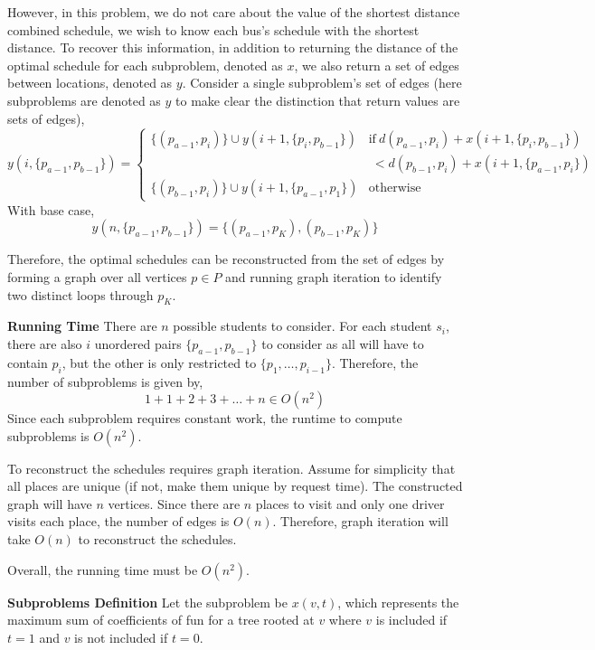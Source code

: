 \documentclass[12pt,twoside]{article}
\begin{document}
\begin{problems}
However, in this problem, we do not care about the value of the shortest
distance combined schedule, we wish to know each bus's schedule with the
shortest distance. To recover this information, in addition to returning the
distance of the optimal schedule for each subproblem, denoted as $x$, we also
return a set of edges between locations, denoted as $y$. Consider a single
subproblem's set of edges (here subproblems are denoted as $y$ to make clear
the distinction that return values are sets of edges),
$$ y(i, \{p_{a-1}, p_{b-1}\}) = \begin{cases}
  \{(p_{a-1}, p_i)\} \cup y(i + 1, \{p_i, p_{b-1}\}) & \mathrm{if}\ d(p_{a-1}, p_i)
  + x(i + 1, \{p_i, p_{b-1}\}) \\
  & \ < d(p_{b-1}, p_i) + x(i + 1, \{p_{a-1}, p_i\}) \\
  \{(p_{b-1}, p_i)\} \cup y(i + 1, \{p_{a-1}, p_1\}) & \mathrm{otherwise}
\end{cases} $$
With base case,
$$ y(n, \{p_{a-1}, p_{b-1}\}) = \{(p_{a-1}, p_K), (p_{b-1}, p_K) \} $$

Therefore, the optimal schedules can be reconstructed from the set of edges
by forming a graph over all vertices $p \in P$ and running graph iteration to
identify two distinct loops through $p_K$.

{\bf Running Time} There are $n$ possible students to consider. For each
student $s_i$, there are also $i$ unordered pairs $\{p_{a-1}, p_{b-1}\}$ to
consider as all will have to contain $p_i$, but the other is only restricted
to $\{p_1, \ldots, p_{i - 1}\}$. Therefore, the number of subproblems is
given by,
$$ 1 + 1 + 2 + 3 + \ldots + n \in O(n^2) $$
Since each subproblem requires constant work, the runtime to compute
subproblems is $O(n^2)$. 

To reconstruct the schedules requires graph iteration. Assume for simplicity
that all places are unique (if not, make them unique by request time). The
constructed graph will have $n$ vertices. Since there are $n$ places to visit
and only one driver visits each place, the number of edges is $O(n)$.
Therefore, graph iteration will take $O(n)$ to reconstruct the schedules.

Overall, the running time must be $O(n^2)$.

\newpage
\problem  %

{\bf Subproblems Definition} Let the subproblem be $x(v, t)$, which
represents the maximum sum of coefficients of fun for a tree rooted at $v$
where $v$ is included if $t = 1$ and $v$ is not included if $t = 0$.


\end{problems}
\end{document}
